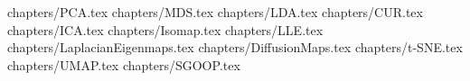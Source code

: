 \clearpage 
 {chapters/PCA.tex}
\clearpage
 {chapters/MDS.tex}
\clearpage
 {chapters/LDA.tex}
\clearpage
 {chapters/CUR.tex}
\clearpage
 {chapters/ICA.tex}
\clearpage
 {chapters/Isomap.tex}
\clearpage
 {chapters/LLE.tex}
\clearpage
 {chapters/LaplacianEigenmaps.tex}
\clearpage
 {chapters/DiffusionMaps.tex}
\clearpage
 {chapters/t-SNE.tex}
\clearpage
 {chapters/UMAP.tex}
\clearpage
 {chapters/SGOOP.tex}